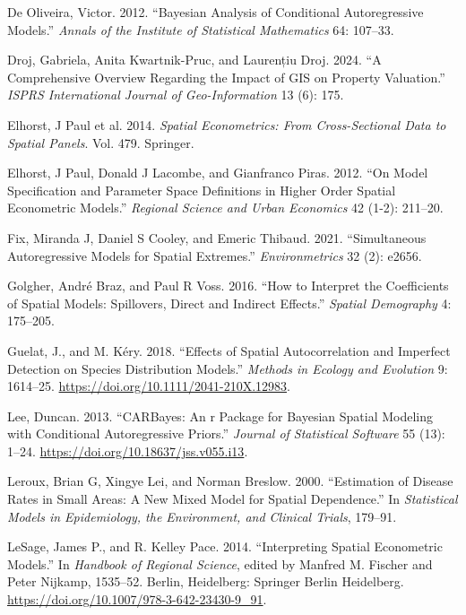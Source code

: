 \documentclass[
  default,
]{sn-jnl}
\newlength{\cslhangindent}
\newenvironment{CSLReferences}[2] %
 {\begin{list}{}{%
  \setlength{\itemindent}{0pt}
  \setlength{\leftmargin}{0pt}
  \setlength{\parsep}{0pt}
  \ifodd #1
   \setlength{\leftmargin}{\cslhangindent}
   \setlength{\itemindent}{-1\cslhangindent}
  \fi
  \setlength{\itemsep}{#2\baselineskip}}}
 {\end{list}}
\begin{document}
\begin{CSLReferences}{1}{0}
De Oliveira, Victor. 2012. {``Bayesian Analysis of Conditional
Autoregressive Models.''} \emph{Annals of the Institute of Statistical
Mathematics} 64: 107--33.

Droj, Gabriela, Anita Kwartnik-Pruc, and Laurențiu Droj. 2024. {``A
Comprehensive Overview Regarding the Impact of GIS on Property
Valuation.''} \emph{ISPRS International Journal of Geo-Information} 13
(6): 175.

Elhorst, J Paul et al. 2014. \emph{Spatial Econometrics: From
Cross-Sectional Data to Spatial Panels}. Vol. 479. Springer.

Elhorst, J Paul, Donald J Lacombe, and Gianfranco Piras. 2012. {``On
Model Specification and Parameter Space Definitions in Higher Order
Spatial Econometric Models.''} \emph{Regional Science and Urban
Economics} 42 (1-2): 211--20.

Fix, Miranda J, Daniel S Cooley, and Emeric Thibaud. 2021.
{``Simultaneous Autoregressive Models for Spatial Extremes.''}
\emph{Environmetrics} 32 (2): e2656.

Golgher, André Braz, and Paul R Voss. 2016. {``How to Interpret the
Coefficients of Spatial Models: Spillovers, Direct and Indirect
Effects.''} \emph{Spatial Demography} 4: 175--205.

Guelat, J., and M. Kéry. 2018. {``Effects of Spatial Autocorrelation and
Imperfect Detection on Species Distribution Models.''} \emph{Methods in
Ecology and Evolution} 9: 1614--25.
\url{https://doi.org/10.1111/2041-210X.12983}.

Lee, Duncan. 2013. {``CARBayes: An r Package for Bayesian Spatial
Modeling with Conditional Autoregressive Priors.''} \emph{Journal of
Statistical Software} 55 (13): 1--24.
\url{https://doi.org/10.18637/jss.v055.i13}.

Leroux, Brian G, Xingye Lei, and Norman Breslow. 2000. {``Estimation of
Disease Rates in Small Areas: A New Mixed Model for Spatial
Dependence.''} In \emph{Statistical Models in Epidemiology, the
Environment, and Clinical Trials}, 179--91.

LeSage, James P., and R. Kelley Pace. 2014. {``Interpreting Spatial
Econometric Models.''} In \emph{Handbook of Regional Science}, edited by
Manfred M. Fischer and Peter Nijkamp, 1535--52. Berlin, Heidelberg:
Springer Berlin Heidelberg.
\url{https://doi.org/10.1007/978-3-642-23430-9_91}.


\end{CSLReferences}
\end{document}
